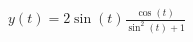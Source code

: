 \documentclass[preview]{standalone}
\begin{document}
\begin{align*}
y(t) = 2\sin(t)\frac{  \cos(t) }{\sin^2(t) + 1}
\end{align*}
\end{document}
